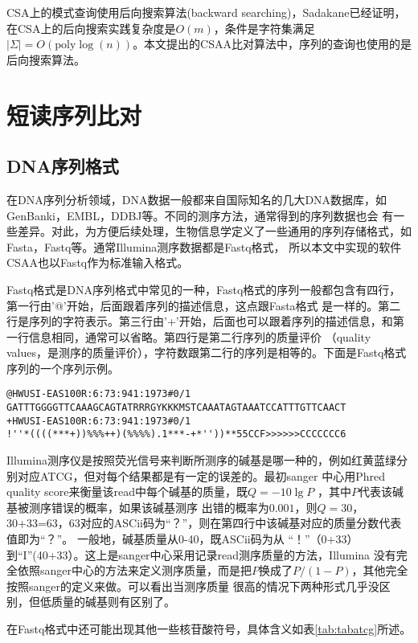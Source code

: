 CSA上的模式查询使用后向搜索算法(backward searching)，Sadakane已经证明，在CSA上的后向搜索实践复杂度是$O(m)$，条件是字符集满足
$|\Sigma|=O(\text{poly} \log(n))$\cite{sadakane2002succinct}。本文提出的CSAA比对算法中，序列的查询也使用的是后向搜索算法。

\section{短读序列比对}

\subsection{DNA序列格式}

在DNA序列分析领域，DNA数据一般都来自国际知名的几大DNA数据库，如GenBanki，EMBL，DDBJ等。不同的测序方法，通常得到的序列数据也会
有一些差异。对此，为方便后续处理，生物信息学定义了一些通用的序列存储格式，如Fasta，Fastq等。通常Illumina测序数据都是Fastq格式，
所以本文中实现的软件CSAA也以Fastq作为标准输入格式。

Fastq\cite{cock2010sanger}格式是DNA序列格式中常见的一种，Fastq格式的序列一般都包含有四行，第一行由'@'开始，后面跟着序列的描述信息，这点跟Fasta格式
是一样的。第二行是序列的字符表示。第三行由'+'开始，后面也可以跟着序列的描述信息，和第一行信息相同，通常可以省略。第四行是第二行序列的质量评价
（quality values，是测序的质量评价），字符数跟第二行的序列是相等的。下面是Fastq格式序列的一个序列示例。

\begin{verbatim}
@HWUSI-EAS100R:6:73:941:1973#0/1
GATTTGGGGTTCAAAGCAGTATRRRGYKKKMSTCAAATAGTAAATCCATTTGTTCAACT
+HWUSI-EAS100R:6:73:941:1973#0/1
!''*((((***+))%%%++)(%%%%).1***-+*''))**55CCF>>>>>>CCCCCCC6
\end{verbatim}

Illumina测序仪是按照荧光信号来判断所测序的碱基是哪一种的，例如红黄蓝绿分别对应ATCG，但对每个结果都是有一定的误差的。最初sanger
中心用Phred quality score来衡量该read中每个碱基的质量，既$Q=-10\lg P$ ，其中$P$代表该碱基被测序错误的概率，如果该碱基测序
出错的概率为$0.001$，则$Q=30$，30+33=63，63对应的ASCii码为“？”，则在第四行中该碱基对应的质量分数代表值即为“？”。
一般地，碱基质量从0-40，既ASCii码为从 “！”（0+33）到“I”(40+33）。这上是sanger中心采用记录read测序质量的方法，Illumina
没有完全依照sanger中心的方法来定义测序质量，而是把$P$换成了$P/(1-P)$，其他完全按照sanger的定义来做。可以看出当测序质量
很高的情况下两种形式几乎没区别，但低质量的碱基则有区别了。

在Fastq格式中还可能出现其他一些核苷酸符号，具体含义如表\ref{tab:tabatcg}所述。

